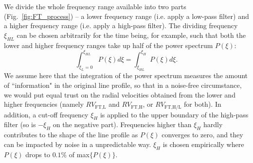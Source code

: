 We divide the whole frequency range available into two parts (Fig.~\ref{fig:FT_process}) -- a lower frequency range (i.e. apply a low-pass filter) and a higher frequency range (i.e. apply a high-pass filter). The dividing frequency $\xi_{HL}$ can be chosen arbitrarily for the time being, for example, such that both the lower and higher frequency ranges take up half of the power spectrum $P(\xi)$:
\begin{equation}
	\int_{\xi_{L}=0}^{\xi_{HL}} P(\xi) d\xi = \int_{\xi_{HL}}^{\xi_{H}} P(\xi) d\xi. 
\end{equation}
We assume here that the integration of the power spectrum measures the amount of ``information" in the original line profile, so that in a noise-free circumstance, we would put equal trust on the radial velocities obtained from the lower and higher frequencies (namely $RV_\text{FT,L}$ and $RV_\text{FT,H}$, or $RV_\text{FT,H/L}$ for both). In addition, a cut-off frequency $\xi_{H}$ is applied to the upper boundary of the high-pass filter (so is $-\xi_{H}$ on the negative part). Frequencies higher than $\xi_{H}$ hardly contributes to the shape of the line profile as $P(\xi)$ converges to zero, and they can be impacted by noise in a unpredictable way. $\xi_{H}$ is chosen empirically where $P(\xi)$ drops to $0.1\%$ of max$\{P(\xi)\}$.

